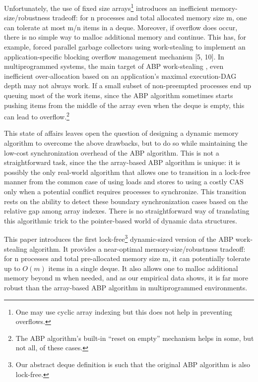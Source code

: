 Unfortunately, the use of fixed size arrays\footnote{One may use
  cyclic array indexing but this does not help in preventing
  overflows.} introduces an inefficient memory-size/robustness
tradeoff: for n processes and total allocated memory size m, one can
tolerate at most m/n items in a deque. Moreover, if overflow does
occur, there is no simple way to malloc additional memory and
continue. This has, for example, forced parallel garbage collectors
using work-stealing to implement an application-specific blocking
overflow management mechanism [5, 10]. In multiprogrammed systems, the
main target of ABP work-stealing \cite{Arora2001}, even inefficient
over-allocation based on an application's maximal execution-DAG depth
\cite{Arora2001, Blumofe1999} may not always work. If a small subset
of non-preempted processes end up queuing most of the work items,
since the ABP algorithm sometimes starts pushing items from the middle
of the array even when the deque is empty, this can lead to
overflow.\footnote{The ABP algorithm's built-in ``reset on empty''
  mechanism helps in some, but not all, of these cases.}

This state of affairs leaves open the question of designing a
dynamic memory algorithm to overcome the above drawbacks, but to do so
while maintaining the low-cost synchronization overhead of the ABP
algorithm. This is not a straightforward task, since the the
array-based ABP algorithm is unique: it is possibly the only
real-world algorithm that allows one to transition in a lock-free
manner from the common case of using loads and stores to using a
costly CAS only when a potential conflict requires processes to
synchronize. This transition rests on the ability to detect these
boundary synchronization cases based on the relative gap among array
indexes. There is no straightforward way of translating this
algorithmic trick to the pointer-based world of dynamic data
structures.


This paper introduces the first lock-free\footnote{Our abstract deque
  definition is such that the original ABP algorithm is also
  lock-free.} dynamic-sized version of the ABP work-stealing
algorithm. It provides a near-optimal memory-size/robustness tradeoff:
for n processes and total pre-allocated memory size m, it can
potentially tolerate up to $O(m)$ items in a single deque. It also
allows one to malloc additional memory beyond m when needed, and as
our empirical data shows, it is far more robust than the array-based
ABP algorithm in multiprogrammed environments.

